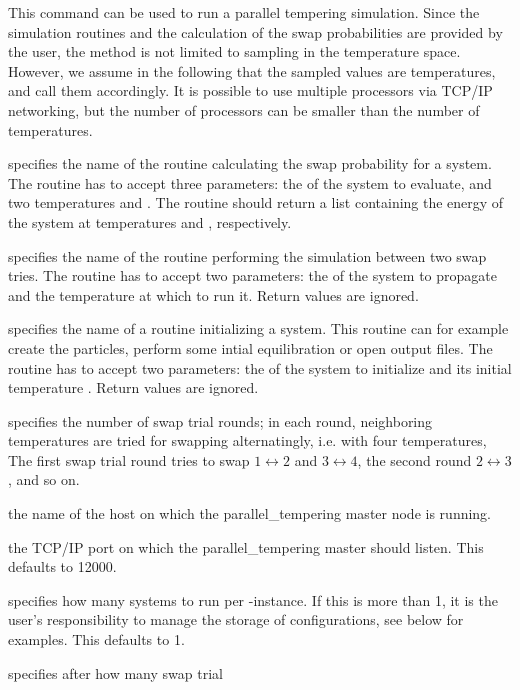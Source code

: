 This command can be used to run a parallel tempering simulation. Since the simulation routines and
the calculation of the swap probabilities are provided by the user, the method is not limited to
sampling in the temperature space. However, we assume in the following that the sampled values are
temperatures, and call them accordingly. It is possible to use multiple processors via TCP/IP
networking, but the number of processors can be smaller than the number of temperatures.

\begin{arguments}
\item[\var{swap}] specifies the name of the routine calculating the
  swap probability for a system. The routine has to accept three
  parameters: the  of the system to evaluate, and two
  temperatures  and . The routine should return a
  list containing the energy of the system at temperatures 
  and , respectively.
\item[\var{perform}] specifies the name of the routine performing the
  simulation between two swap tries. The routine has to accept two
  parameters: the  of the system to propagate and the
  temperature  at which to run it. Return values are ignored.
\item[\var{init}] specifies the name of a routine initializing a
  system. This routine can for example create the particles, perform
  some intial equilibration or open output files.  The routine has to
  accept two parameters: the  of the system to initialize and
  its initial temperature . Return values are ignored.
\item[\var{R}] specifies the number of swap trial rounds; in each
  round, neighboring temperatures are tried for swapping
  alternatingly, i.e. with four temperatures, The first swap trial
  round tries to swap $1\leftrightarrow 2$ and $3\leftrightarrow 4$,
  the second round $2\leftrightarrow 3$, and so on.
\item[\var{master}] the name of the host on which the
  parallel_tempering master node is running.
\item[\var{port}] the TCP/IP port on which the parallel_tempering
  master should listen. This defaults to 12000.
\item[\var{j_\mathrm{node}}] specifies how many systems to run per
  \es{}-instance. If this is more than 1, it is the user's
  responsibility to manage the storage of configurations, see below
  for examples.  This defaults to 1.
\item[\var{R_\mathrm{reset}}] specifies after how many swap trial

\end{arguments}

